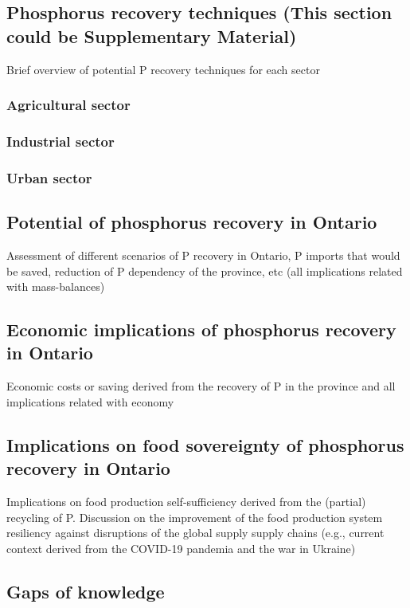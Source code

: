 \documentclass[authoryear]{elsarticle}
\begin{document}
\subsection{Phosphorus recovery techniques \textbf{(This section could be Supplementary Material)}}
Brief overview of potential P recovery techniques for each sector
\subsubsection{Agricultural sector}

\subsubsection{Industrial sector}

\subsubsection{Urban sector}

\subsection{Potential of phosphorus recovery in Ontario}
Assessment of different scenarios of P recovery in Ontario, P imports that would be saved, reduction of P dependency of the province, etc (all implications related with mass-balances)

\subsection{Economic implications of phosphorus recovery in Ontario}
Economic costs or saving derived from the recovery of P in the province and all implications related with economy

\subsection{Implications on food sovereignty of phosphorus recovery in Ontario}
Implications on food production self-sufficiency derived from the (partial) recycling of P. Discussion on the improvement of the food production system resiliency against disruptions of the global supply supply chains  (e.g., current context derived from the COVID-19 pandemia and the war in Ukraine)

\subsection{Gaps of knowledge}
\end{document}
